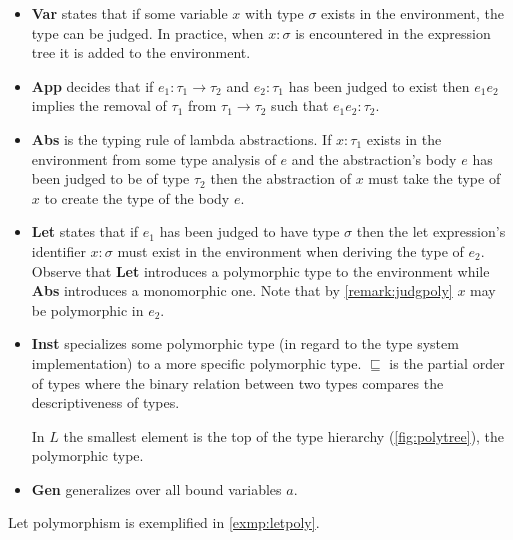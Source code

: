 \documentclass[11pt,oneside,a4paper]{report}
\begin{document}
\begin{itemize}
    \item \textbf{Var} states that if some variable $x$ with type $\sigma$ exists in the environment, the type can be judged.
        In practice, when $x: \sigma$ is encountered in the expression tree it is added to the environment.
    \item \textbf{App} decides that if $e_1 : \tau_1 \rightarrow \tau_2$ and $e_2 : \tau_1$ has been judged to exist then $e_1 e_2$ implies the removal of $\tau_1$ from $\tau_1 \rightarrow \tau_2$ such that $e_1 e_2: \tau_2$.
    \item \textbf{Abs} is the typing rule of lambda abstractions.
        If $x : \tau_1$ exists in the environment from some type analysis of $e$ and the abstraction's body $e$ has been judged to be of type $\tau_2$ then the abstraction of $x$ must take the type of $x$ to create the type of the body $e$.
    \item \textbf{Let} states that if $e_1$ has been judged to have type $\sigma$ then the let expression's identifier $x: \sigma$ must exist in the environment when deriving the type of $e_2$.
        Observe that \textbf{Let} introduces a polymorphic type to the environment while \textbf{Abs} introduces a monomorphic one.
        Note that by \autoref{remark:judgpoly} $x$ may be polymorphic in $e_2$.
    \item \textbf{Inst} specializes some polymorphic type (in regard to the type system implementation) to a more specific polymorphic type.
        $\sqsubseteq$ is the partial order of types where the binary relation between two types compares the descriptiveness of types.
        \begin{exmp}
            In $L$ the smallest element is the top of the type hierarchy (\autoref{fig:polytree}), the polymorphic type.
        \end{exmp}
    \item \textbf{Gen} generalizes over all bound variables $a$.
\end{itemize}
Let polymorphism is exemplified in \autoref{exmp:letpoly}.
\end{document}
